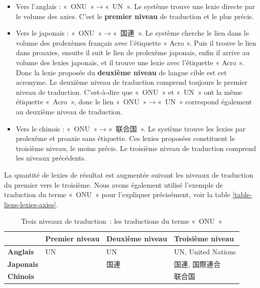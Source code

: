 \documentclass[10pt,a4paper,twoside]{article}
\newcommand{\Chinois}[1]{{\fontspec[Scale=0.9]{STSong}#1}}
\newcommand{\Japonais}[1]{{\fontspec[Scale=0.9]{Hiragino Kaku Gothic Pro}#1}}
\begin{document}
\begin{itemize}
\item Vers l’anglais : « ONU »\ensuremath{\to}« UN ». Le système trouve une lexie directe par le volume des axies. C’est le \textbf{premier niveau} de traduction et le plus précis.
\item Vers le japonais : « ONU »\ensuremath{\to}« \Japonais{国連} ». Le système cherche le lien dans le volume des prolexèmes français avec l’étiquette « Acro ». Puis il trouve le lien dans proaxies, ensuite il suit le lien de prolexème japonais, enfin il arrive au volume des lexies japonais, et il trouve une lexie avec l’étiquette « Acro ». Donc la lexie proposée du \textbf{deuxième niveau} de langue cible est cet acronyme. Le deuxième niveau de traduction comprend toujours le premier niveau de traduction. C'est-à-dire que « ONU » et « UN » ont la même étiquette « Acro », donc le lien « ONU »\ensuremath{\to}« UN » correspond également au deuxième niveau de traduction.
\item Vers le chinois : « ONU »\ensuremath{\to}« \Chinois{联合国} ». Le système trouve les lexies par prolexème et proaxie sans étiquette. Ces lexies proposées constituent le troisième niveau, le moins précis. Le troisième niveau de traduction comprend les niveaux précédents.
\end{itemize}
La quantité de lexies de résultat est augmentée suivant les niveaux de traduction du premier vers le troisième. Nous avons également utilisé l'exemple de traduction du terme « ONU » pour l'expliquer précisément, voir la table \ref{table-liens-lexies-axies}.

\begin{table}[!h]
\centering
	\begin{tabular}{|l|l|l|l|}
	\hline
	\textbf{} & \textbf{Premier niveau} & \textbf{Deuxième niveau} & \textbf{Troisième niveau} \\
	\hline
	\textbf{Anglais} & UN & UN & UN, United Nations \\
	\hline
	\textbf{Japonais} &  & \Japonais{国連} &\Japonais{国連}, \Japonais{国際連合} \\
	\hline
	\textbf{Chinois} & & &\Chinois{联合国}  \\
	\hline
	\end{tabular}
\caption{ Trois niveaux de traduction : les traductions du terme « ONU » }\label{table-3-niveaux-traduction}
\end{table}
\end{document}
